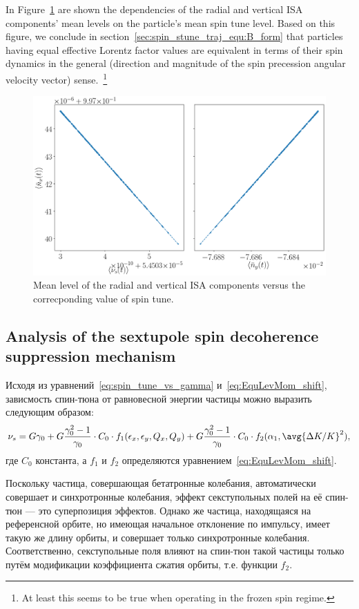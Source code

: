 In Figure~\ref{decoh:fig:nbar_vs_ST} are shown the dependencies of the radial and vertical ISA components'
mean levels on the particle's mean spin tune level. Based on this figure, we conclude
in section~\ref{sec:spin_stune_traj_equ:B_form} that particles having equal effective Lorentz factor values
are equivalent in terms of their spin dynamics in the general (direction and magnitude of the spin precession
angular velocity vector) sense.~\footnote{At least this seems to be true when operating
  in the frozen spin regime.}
\begin{figure}[!h]
	\centering
	\includegraphics[width=\linewidth]{images/decoh_sim/mean_n_bar_vs_spin_tune}
	\caption{Mean level of the radial and vertical ISA components versus the correcponding
          value of spin tune.\label{decoh:fig:nbar_vs_ST}}
\end{figure}

\subsection{Analysis of the sextupole spin decoherence suppression mechanism}\label{sec:sext_decoh_suppression_effect_analysis}
Исходя из уравнений~\eqref{eq:spin_tune_vs_gamma} и~\eqref{eq:EquLevMom_shift}, зависмость спин-тюна от равновесной энергии частицы можно выразить следующим образом:
\[
\nu_s = G\gamma_0 + G\frac{\gamma_0^2-1}{\gamma_0}\cdot C_0\cdot f_1(\epsilon_x, \epsilon_y, Q_x, Q_y)+ G\frac{\gamma_0^2-1}{\gamma_0}\cdot C_0\cdot f_2(\alpha_1, \avg{\Delta K/K}^2),
\]
где $C_0$ константа, а $f_1$ и $f_2$ определяются уравнением~\eqref{eq:EquLevMom_shift}.

Поскольку частица, совершающая бетатронные колебания, автоматически совершает и синхротронные колебания, эффект секступольных полей на её спин-тюн --- это суперпозиция эффектов. Однако же частица, находящаяся на референсной орбите, но имеющая начальное отклонение по импульсу, имеет такую же длину орбиты, и совершает только синхротронные колебания. Соответственно, секступольные поля влияют на спин-тюн такой частицы только путём модификации коэффициента сжатия орбиты, т.е. функции $f_2$. 


